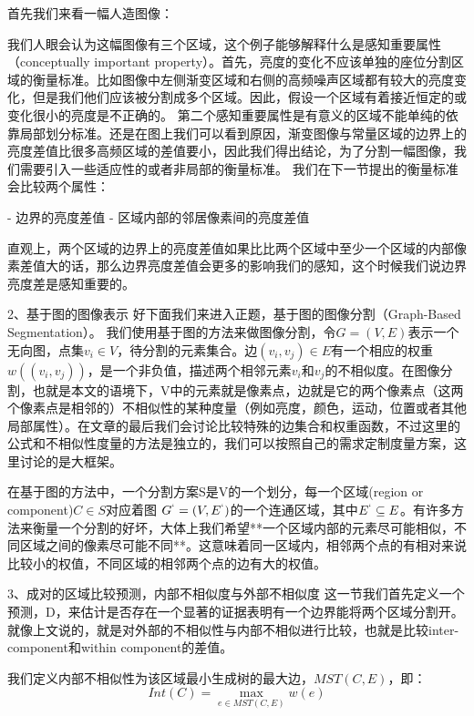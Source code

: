 首先我们来看一幅人造图像：


我们人眼会认为这幅图像有三个区域，这个例子能够解释什么是感知重要属性（conceptually important property）。首先，亮度的变化不应该单独的座位分割区域的衡量标准。比如图像中左侧渐变区域和右侧的高频噪声区域都有较大的亮度变化，但是我们他们应该被分割成多个区域。因此，假设一个区域有着接近恒定的或变化很小的亮度是不正确的。
第二个感知重要属性是有意义的区域不能单纯的依靠局部划分标准。还是在图上我们可以看到原因，渐变图像与常量区域的边界上的亮度差值比很多高频区域的差值要小，因此我们得出结论，为了分割一幅图像，我们需要引入一些适应性的或者非局部的衡量标准。
我们在下一节提出的衡量标准会比较两个属性：

- 边界的亮度差值
- 区域内部的邻居像素间的亮度差值

直观上，两个区域的边界上的亮度差值如果比比两个区域中至少一个区域的内部像素差值大的话，那么边界亮度差值会更多的影响我们的感知，这个时候我们说边界亮度差是感知重要的。

2、基于图的图像表示
好下面我们来进入正题，基于图的图像分割（Graph-Based Segmentation）。
我们使用基于图的方法来做图像分割，令\(G=(V,E)\)表示一个无向图，点集\(v_i \in V\)，待分割的元素集合。边\((v_i,v_j) \in E\)有一个相应的权重\(w((v_i,v_j))\)，是一个非负值，描述两个相邻元素\(v_i\)和\(v_j\)的不相似度。在图像分割，也就是本文的语境下，V中的元素就是像素点，边就是它的两个像素点（这两个像素点是相邻的）不相似性的某种度量（例如亮度，颜色，运动，位置或者其他局部属性）。在文章的最后我们会讨论比较特殊的边集合和权重函数，不过这里的公式和不相似性度量的方法是独立的，我们可以按照自己的需求定制度量方案，这里讨论的是大框架。

在基于图的方法中，一个分割方案S是V的一个划分，每一个区域(region or component)\(C \in S\)对应着图
\(G^` = (V,E^`)\)的一个连通区域，其中\(E^` \subseteq E\)。有许多方法来衡量一个分割的好坏，大体上我们希望**一个区域内部的元素尽可能相似，不同区域之间的像素尽可能不同**。这意味着同一区域内，相邻两个点的有相对来说比较小的权值，不同区域的相邻两个点的边有大的权值。

3、成对的区域比较预测，内部不相似度与外部不相似度
这一节我们首先定义一个预测，D，来估计是否存在一个显著的证据表明有一个边界能将两个区域分割开。就像上文说的，就是对外部的不相似性与内部不相似进行比较，也就是比较inter-component和within component的差值。

我们定义内部不相似性为该区域最小生成树的最大边，\(MST(C,E)\)，即：
\begin{equation}
Int(C) = \mathop {\max }\limits_{e \in MST(C,E)}w(e)
\end{equation}

